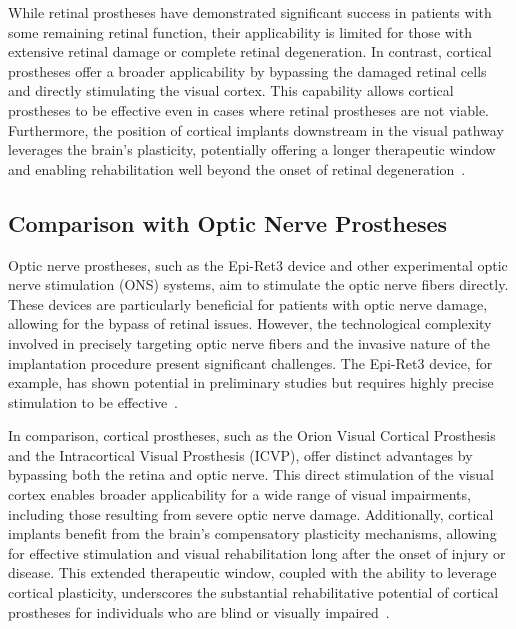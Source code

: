 \documentclass[twocolumn,10pt]{article}
\begin{document}
While retinal prostheses have demonstrated significant success in patients with some remaining retinal function, their applicability is limited for those with extensive retinal damage or complete retinal degeneration. In contrast, cortical prostheses offer a broader applicability by bypassing the damaged retinal cells and directly stimulating the visual cortex. This capability allows cortical prostheses to be effective even in cases where retinal prostheses are not viable. Furthermore, the position of cortical implants downstream in the visual pathway leverages the brain's plasticity, potentially offering a longer therapeutic window and enabling rehabilitation well beyond the onset of retinal degeneration~\parencite{tzekovGabelEdArtificial2020}.

\subsection*{Comparison with Optic Nerve Prostheses}
Optic nerve prostheses, such as the Epi-Ret3 device and other experimental optic nerve stimulation (ONS) systems, aim to stimulate the optic nerve fibers directly. These devices are particularly beneficial for patients with optic nerve damage, allowing for the bypass of retinal issues. However, the technological complexity involved in precisely targeting optic nerve fibers and the invasive nature of the implantation procedure present significant challenges. The Epi-Ret3 device, for example, has shown potential in preliminary studies but requires highly precise stimulation to be effective~\parencite{trieuImplantsEpiretinalStimulation2009}.

In comparison, cortical prostheses, such as the Orion Visual Cortical Prosthesis
and the Intracortical Visual Prosthesis (ICVP), offer distinct advantages by
bypassing both the retina and optic nerve. This direct stimulation of the visual
cortex enables broader applicability for a wide range of visual impairments,
including those resulting from severe optic nerve damage. Additionally, cortical
implants benefit from the brain's compensatory plasticity mechanisms, allowing
for effective stimulation and visual rehabilitation long after the onset of
injury or disease. This extended therapeutic window, coupled with the ability to
leverage cortical plasticity, underscores the substantial rehabilitative
potential of cortical prostheses for individuals who are blind or visually
impaired~\parencite{beyelerLearningSeeAgain2017}.
\end{document}
